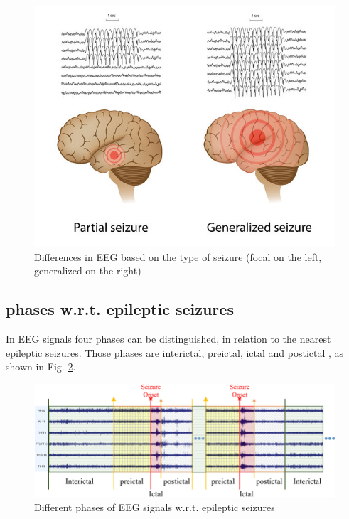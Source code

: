 \begin{figure}[t]
    \centering
    \includegraphics[width=1.0\textwidth]{images/State-of-art/eeg-seizure-partial-generalized.jpg}
    \caption{Differences in EEG based on the type of seizure (focal on the left, generalized on the right)          \cite{bates_epileptic_2018}}
    \label{fig:eeg-seizure-partial-generalized}
\end{figure}

\subsection{ phases w.r.t. epileptic seizures}
In \gls{EEG} signals four phases can be distinguished, in relation to the nearest epileptic seizures. Those phases are interictal, preictal, ictal and postictal \cite{cui_learning_2018, epilepsy_foundation_seizure_nodate, heidi_moawad_your_2020}, as shown in Fig. \ref{fig:seizure-phases}.

\begin{figure}[ht]
    \centering
    \includegraphics[width=1.0\textwidth]{images/State-of-art/seizure-phases.png}
    \caption{Different phases of EEG signals w.r.t. epileptic seizures \cite{cui_learning_2018}}
    \label{fig:seizure-phases}
\end{figure}

